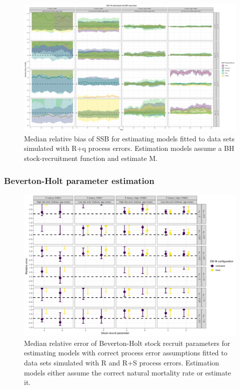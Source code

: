 \documentclass[
  12pt,
]{article}
\begin{document}
\begin{landscape}
\begin{figure}
\caption{Median relative bias of SSB for estimating models fitted to data sets simulated with R+q process errors. Estimation models assume a BH stock-recruitment function and estimate M.}\label{q_om_em_BH_ME_relbias_ssb}
\begin{center}
\includegraphics[width = \textwidth]{q_om_BH_ME_relbias_ssb.png}
\end{center}
\end{figure}
\end{landscape}

\hypertarget{beverton-holt-parameter-estimation}{%
\subsubsection{Beverton-Holt parameter
estimation}\label{beverton-holt-parameter-estimation}}

\begin{landscape}
\begin{figure}
\caption{Median relative error of Beverton-Holt stock recruit parameters for estimating models with correct process error assumptions fitted to data sets simulated with R and R+S process errors. Estimation models either assume the correct natural mortality rate or estimate it.}\label{naa_om_SR_relbias}
\begin{center}
\includegraphics[width = \textwidth]{naa_om_SR_relerror.png}
\end{center}
\end{figure}
\end{landscape}
\end{document}
